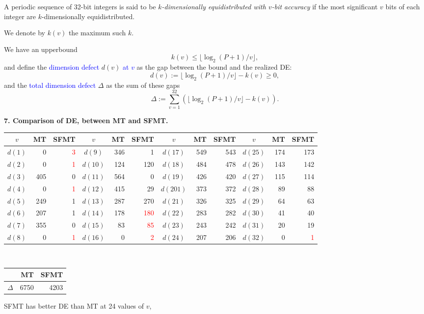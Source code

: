 \documentclass[a4j,12pt,landscape]{jarticle}
\begin{document}
\newpage
A periodic sequence of 32-bit integers is said to be
{\em $k$-dimensionally equidistributed with $v$-bit accuracy}
if the most significant $v$ bits of each integer are
$k$-dimensionally equidistributed. 

We denote by $k(v)$ the maximum such $k$. 

\vskip 5mm
We have an upperbound 
$$
k(v) \leq \lfloor \log_2 (P+1) / v \rfloor, 
$$
and define the \textcolor{blue}{dimension defect} $d(v)$ \textcolor{blue}{at $v$}
as the gap between the bound and the realized DE:
$$
d(v):= \lfloor \log_2 (P+1) / v \rfloor - k(v) \geq 0, 
$$
and the \textcolor{blue}{total dimension defect} $\Delta$
as the sum of these gaps 
$$
\Delta := \sum_{v=1}^{32}(\lfloor \log_2 (P+1) / v \rfloor -k(v)).
$$

\newpage
{\bf 7. Comparison of DE, between MT and SFMT.}
\begin{center}
\LARGE
\begin{tabular}{|c|rr||c|rr||c|rr||c|rr|} \hline
$v$ & MT & SFMT & $v$ & MT & SFMT & $v$ & MT & SFMT & $v$ & MT & SFMT\\ \hline
$d(1)$& 0 & \textcolor{red}{3}
 &$d(9)$& 346 & 1 & $d(17)$ & 549 & 543 & $d(25)$ & 174 & 173\\
$d(2)$& 0 & \textcolor{red}{1} 
&$d(10)$& 124 & 120 & $d(18)$ & 484 & 478 & $d(26)$ & 143 & 142\\
$d(3)$& 405 & 0 &$d(11)$& 564 & 0 & $d(19)$ & 426 & 420 & $d(27)$ & 115 & 114\\
$d(4)$& 0 & \textcolor{red}{1}
 &$d(12)$& 415 & 29 & $d(201)$ & 373 & 372 & $d(28)$ & 89 & 88\\
$d(5)$& 249 & 1 &$d(13)$& 287 & 270 & $d(21)$ & 326 & 325 & $d(29)$ & 64 & 63\\
$d(6)$& 207 & 1 &$d(14)$& 178 & \textcolor{red}{180}
 & $d(22)$ & 283 & 282 & $d(30)$ & 41 & 40\\
$d(7)$& 355 & 0 &$d(15)$& 83 & \textcolor{red}{85}
 & $d(23)$ & 243 & 242 & $d(31)$ & 20 & 19\\
$d(8)$& 0 & \textcolor{red}{1} &$d(16)$& 0 & \textcolor{red}{2}
 & $d(24)$ & 207 & 206 & $d(32)$ & 0 & \textcolor{red}{1} \\ \hline
\end{tabular}\\
\vskip 10mm
\begin{tabular}{crr}\hline
 & MT & SFMT \\ \hline
  $\Delta$ & 6750 & 4203 \\\hline
\end{tabular}
\end{center}
SFMT has better DE than MT at 24 values of $v$, 
\end{document}
